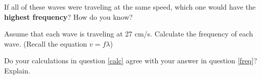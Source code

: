 \documentclass[10pt]{exam}
\begin{document}
\begin{questions}
  \question
    If all of these waves were traveling at the same speed, which one would have the {\bf highest frequency}?  How do you know? \label{freq}
    \vs

  \question
    Assume that each wave is traveling at 27 cm/s.  Calculate the frequency of each wave.  (Recall the equation $v=f\lambda$) \label{calc}

    \renewcommand{\ku}[1][7em]{
      \begin{tabular}
        {p{.2\textwidth}|p{.35\textwidth}|p{.15\textwidth}}
        \small Knowns/Unknowns    &
        \small  Plug \& Chug      & 
        \small Answer w/ Units \\
        &&\\[#1]
      \end{tabular}
}


  \question
    Do your calculations in question \ref{calc} agree with your answer in question \ref{freq}?  Explain.
    \vs


\end{questions}
\end{document}
